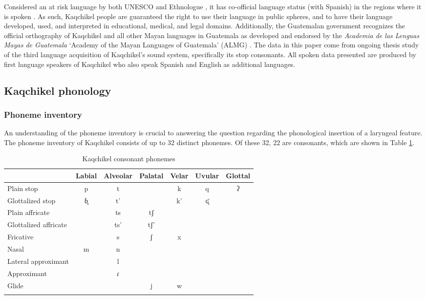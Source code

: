 \documentclass[output=paper,colorlinks,citecolor=brown]{langscibook}
\begin{document}
Considered an at risk language by both UNESCO \citep{unesco} and Ethnologue \citep{ethnologue16}, it has co-official language status (with Spanish) in the regions where it is spoken \citep{decreto_19_2003}. As such, Kaqchikel people are guaranteed the right to use their language in public spheres, and to have their language developed, used, and interpreted in educational, medical, and legal domains. Additionally, the Guatemalan government recognizes the official orthography of Kaqchikel and all other Mayan languages in Guatemala as developed and endorsed by the \emph{Academia de las Lenguas Mayas de Guatemala} ‘Academy of the Mayan Languages of Guatemala’ (ALMG) \citep{decreto_1046-87}.
The data in this paper come from ongoing thesis study of the third language acquisition of Kaqchikel’s sound system, specifically its stop consonants. All spoken data presented are produced by first language speakers of Kaqchikel who also speak Spanish and English as additional languages.

\subsection{Kaqchikel phonology}\label{Kaqchikel phonology}
\subsubsection{Phoneme inventory}\label{Phoneme inventory}
An understanding of the phoneme inventory is crucial to answering the question regarding the phonological insertion of a laryngeal feature. The phoneme inventory of Kaqchikel consists of up to 32 distinct phonemes. Of these 32, 22 are consonants, which are shown in Table \ref{consonants}.

\begin{table}
\caption{Kaqchikel consonant phonemes}
\label{consonants}
 \begin{tabular}{l cccccc}
  \lsptoprule
                        & Labial & Alveolar  & Palatal & Velar & Uvular & Glottal\\
  \midrule
  Plain stop            &   p  &    t   &           & k    & q  & ʔ \\
  Glottalized stop      &   ɓ̥   &   t’  &          & k’    & ʛ̥ \\
  Plain affricate       &       &   ts  &    tʃ    &       & \\
  Glottalized affricate &       &   ts’ &    tʃ’   &       & \\
  Fricative             &       &   s   &    ʃ     & x     & \\
  Nasal                 &   m   &   n   &          &       & \\
  Lateral approximant   &       &   l   &          &       & \\
  Approximant           &       &   ɾ   &          &       & \\
  Glide                 &       &       &   j      & w     & \\
  \lspbottomrule
 \end{tabular}
\end{table}
\end{document}
